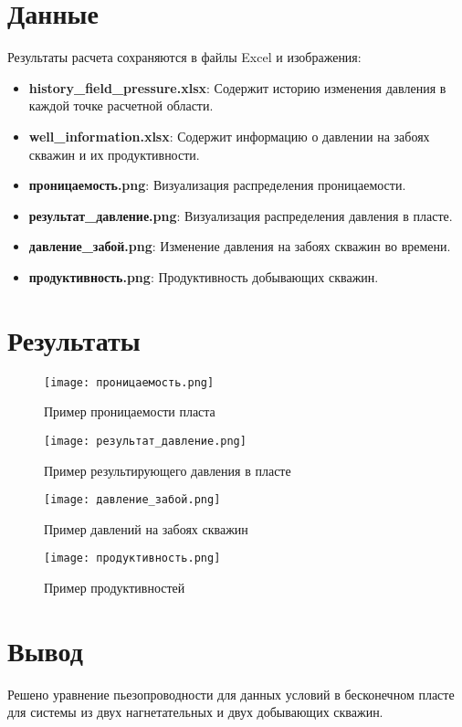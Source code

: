 \documentclass{article}
\begin{document}
\section{Данные}

Результаты расчета сохраняются в файлы Excel и изображения:

\begin{itemize}
    \item \textbf{history\_field\_pressure.xlsx}: Содержит историю изменения давления в каждой точке расчетной области.
    \item \textbf{well\_information.xlsx}: Содержит информацию о давлении на забоях скважин и их продуктивности.
    \item \textbf{проницаемость.png}: Визуализация распределения проницаемости.
    \item \textbf{результат\_давление.png}: Визуализация распределения давления в пласте.
    \item \textbf{давление\_забой.png}: Изменение давления на забоях скважин во времени.
    \item \textbf{продуктивность.png}: Продуктивность добывающих скважин.
\end{itemize}

\section{Результаты}

\begin{figure}[H]
    \centering
    \texttt{[image: проницаемость.png]}
    \caption{Пример проницаемости пласта}
\end{figure}

\begin{figure}[H]
    \centering
    \texttt{[image: результат\_давление.png]}
    \caption{Пример результирующего давления в пласте}
\end{figure}

\begin{figure}[H]
    \centering
    \texttt{[image: давление\_забой.png]}
    \caption{Пример давлений на забоях скважин}
\end{figure}

\begin{figure}[H]
    \centering
    \texttt{[image: продуктивность.png]}
    \caption{Пример продуктивностей}
\end{figure}

\section*{Вывод}

Решено уравнение пьезопроводности для данных условий в бесконечном пласте для системы из двух нагнетательных и двух добывающих скважин.
\end{document}
